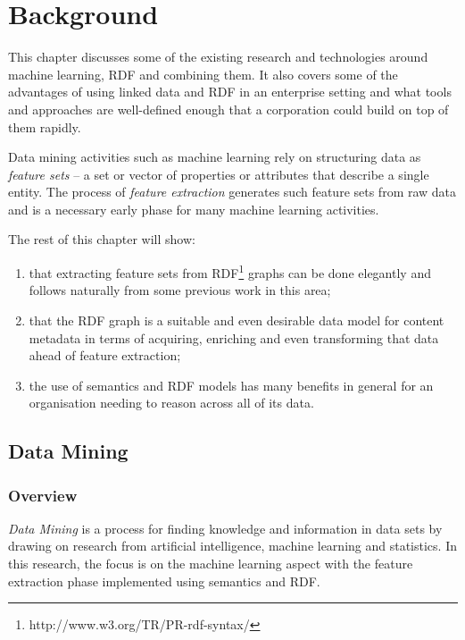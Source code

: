 \chapter{Background}

This chapter discusses some of the existing research and technologies
around machine learning, RDF and combining them. It also covers some
of the advantages of using linked data and RDF in an enterprise
setting and what tools and approaches are well-defined enough that a
corporation could build on top of them rapidly.

Data mining activities such as machine learning rely on structuring
data as \emph{feature sets}\cite{bishop2006pattern} -- a set or vector
of properties or attributes that describe a single entity.
The process of \emph{feature extraction} generates such feature sets
from raw data and is a necessary early phase for many machine learning
activities.

The rest of this chapter will show:

\begin{enumerate}
\item that extracting feature sets from
  RDF\footnote{http://www.w3.org/TR/PR-rdf-syntax/} graphs can be done
  elegantly and follows naturally from some previous work in this area;
\item that the RDF graph is a suitable and even desirable data model for content
  metadata in terms of acquiring, enriching and even transforming that data ahead
  of feature extraction;
  \item the use of semantics and RDF models has many benefits in general
  for an organisation needing to reason across all of its data.
\end{enumerate}

\section{Data Mining}
\subsection{Overview}

\emph{Data Mining} is a process for finding knowledge and information
in data sets by drawing on research from artificial intelligence,
machine learning and statistics.\cite{han2011data} In this research,
the focus is on the machine learning aspect with
the feature extraction phase implemented using semantics and RDF.

